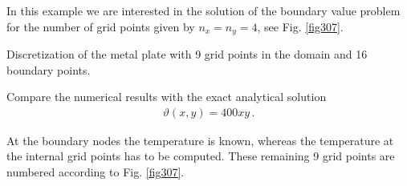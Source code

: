 In this example we are interested in the solution of 
the boundary value problem for the number of grid 
points given by $n_x=n_y=4$, see 
Fig. \ref{fig307}. 

\begin{Figure}[htb]
\begin{center}

\setlength{\baselineskip}{11pt}
\caption{Discretization of the metal plate with 9 grid points 
in the domain and 16 boundary points.}
\label{fig307}
\end{center}
\end{Figure}%

Compare the numerical results with the exact analytical 
solution 
%
\begin{eqnarray}
\vartheta(x,y) = 400 xy \, .
\end{eqnarray}
%

At the boundary nodes the temperature is known, whereas 
the temperature at the internal grid points has to be 
computed. 
These remaining 9 grid points are numbered according 
to Fig. \ref{fig307}. 

